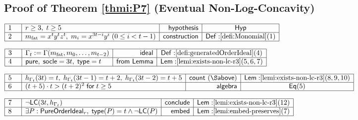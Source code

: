 \documentclass[11pt,reqno]{amsart}
\begin{document}
\medskip


\subsection*{Proof of Theorem \protect\ref{thmi:P7} (Eventual
Non-Log-Concavity)}

\noindent$%
\begin{array}{|m{0.5cm}|l|r|c|}
\hline
1 & r\ge3,\;t\ge5 & \mathsf{hypothesis} & \mathsf{Hyp} \\ \hline
2 & m_{\mathrm{fat}}=x^{t}y^{t}z^{t},\;m_{i}=x^{3t-i}y^{i}\;(0\le i<t-1) & 
\mathsf{construction} & \mathsf{Def:}\ref{defi:Monomial}(1) \\ \hline
\end{array}%
$

\nointerlineskip\noindent$%
\begin{array}{|m{0.5cm}|l|r|c|}
\hline
3 & \Gamma_{t}:=\Gamma(m_{\mathrm{fat}},m_{0},\dots,m_{t-2}) & \mathsf{ideal}
& \mathsf{Def:}\ref{defi:generatedOrderIdeal}(4) \\ \hline
4 & \mathsf{pure},\;\mathsf{socle}=3t,\;\mathsf{type}=t & \mathsf{from\ Lemma%
} & \mathsf{Lem:}\ref{lemi:exists-non-lc-r3}(5,6,7) \\ \hline
\end{array}%
$

\nointerlineskip\noindent$%
\begin{array}{|m{0.5cm}|l|r|c|}
\hline
5 & h_{\Gamma_{t}}(3t)=t,\;h_{\Gamma_{t}}(3t-1)=t+2,\;h_{%
\Gamma_{t}}(3t-2)=t+5 & \mathsf{count\ (\S above)} & \mathsf{Lem:}\ref%
{lemi:exists-non-lc-r3}(8,9,10) \\ \hline
6 & (t+5)\cdot t>(t+2)^{2}\;\mathsf{for}\;t\ge5 & \mathsf{algebra} & \mathsf{%
Eq}(5) \\ \hline
\end{array}%
$

\nointerlineskip\noindent$%
\begin{array}{|m{0.5cm}|l|r|c|}
\hline
7 & \neg\mathsf{LC}(3t,h_{\Gamma_{t}}) & \mathsf{conclude} & \mathsf{Lem:}%
\ref{lemi:exists-non-lc-r3}(12) \\ \hline
8 & \exists P:\mathsf{PureOrderIdeal}_{r},\;\mathsf{type}(P)=t\wedge\neg%
\mathsf{LC}(P) & \mathsf{embed} & \mathsf{Lem:}\ref{lemi:embed-preserves}(7)
\\ \hline
\end{array}%
$
\end{document}

